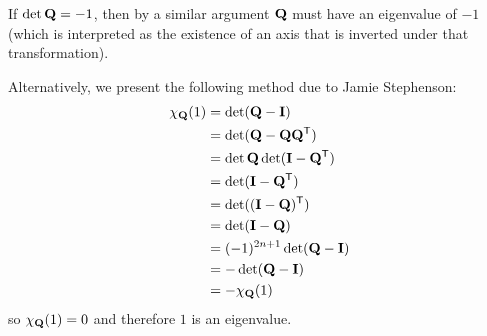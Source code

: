 \documentclass[fleqn,a4paper,11pt]{article}
\begin{document}
\begin{enumerate}[label=\textbf{\arabic*.}]
   If \(\det \mathbf{Q} = -1\), then by a similar argument \(\mathbf{Q}\) must have an
   eigenvalue of \(-1\) (which is interpreted as the existence of an axis that
   is inverted under that transformation).

   Alternatively, we present the following method due to Jamie Stephenson:
   \begin{align*}
    \chi_{\mathbf{Q}}(1)
     &= \det(\mathbf{Q} - \mathbf{I}) \\
     &= \det(\mathbf{Q} - \mathbf{Q} \mathbf{Q}^{\mathsf T}) \\
     &= \det \mathbf{Q}\det(\mathbf{I} - \mathbf{Q}^{\mathsf T}) \\
     &= \det(\mathbf{I} - \mathbf{Q}^{\mathsf T}) \\
     &= \det((\mathbf{I} - \mathbf{Q})^{\mathsf T}) \\
     &= \det(\mathbf{I} - \mathbf{Q}) \\
     &= (-1)^{2n + 1}\det(\mathbf{Q} - \mathbf{I}) \\
     &= -\det(\mathbf{Q} - \mathbf{I}) \\
     &= -\chi_{\mathbf{Q}}(1)
   \end{align*}
   so \(\chi_{\mathbf{Q}}(1) = 0\) and therefore \(1\) is an eigenvalue.


\end{enumerate}
\end{document}
